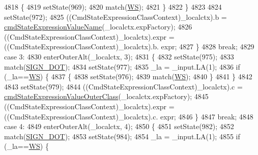 \begin{DoxyCode}
4818           \{
4819           setState(969);
4820           match(\hyperlink{classgov_1_1nasa_1_1jpf_1_1inspector_1_1server_1_1expression_1_1parser_1_1_expression_grammar_parser_ace44714ae633c7b14794cc5a24d9ebf3}{WS});
4821           \}
4822         \}
4823 
4824         setState(972);
4825         ((CmdStateExpressionClassContext)\_localctx).b = 
      \hyperlink{classgov_1_1nasa_1_1jpf_1_1inspector_1_1server_1_1expression_1_1parser_1_1_expression_grammar_parser_ab7b7d7ff1d67db1969528b9cb4557d4e}{cmdStateExpressionValueName}(\_localctx.expFactory);
4826          ((CmdStateExpressionClassContext)\_localctx).expr =  ((CmdStateExpressionClassContext)\_localctx).b.
      expr; 
4827         \}
4828         \textcolor{keywordflow}{break};
4829       \textcolor{keywordflow}{case} 3:
4830         enterOuterAlt(\_localctx, 3);
4831         \{
4832         setState(975);
4833         match(\hyperlink{classgov_1_1nasa_1_1jpf_1_1inspector_1_1server_1_1expression_1_1parser_1_1_expression_grammar_parser_af578d1cac8553bcf6f52608a4e9125f1}{SIGN\_DOT});
4834         setState(977);
4835         \_la = \_input.LA(1);
4836         \textcolor{keywordflow}{if} (\_la==\hyperlink{classgov_1_1nasa_1_1jpf_1_1inspector_1_1server_1_1expression_1_1parser_1_1_expression_grammar_parser_ace44714ae633c7b14794cc5a24d9ebf3}{WS}) \{
4837           \{
4838           setState(976);
4839           match(\hyperlink{classgov_1_1nasa_1_1jpf_1_1inspector_1_1server_1_1expression_1_1parser_1_1_expression_grammar_parser_ace44714ae633c7b14794cc5a24d9ebf3}{WS});
4840           \}
4841         \}
4842 
4843         setState(979);
4844         ((CmdStateExpressionClassContext)\_localctx).c = 
      \hyperlink{classgov_1_1nasa_1_1jpf_1_1inspector_1_1server_1_1expression_1_1parser_1_1_expression_grammar_parser_a3cb4602fb37c47251dc62b7e1d7c9f0c}{cmdStateExpressionValueOuterClass}(\_localctx.expFactory);
4845          ((CmdStateExpressionClassContext)\_localctx).expr =  ((CmdStateExpressionClassContext)\_localctx).c.
      expr; 
4846         \}
4847         \textcolor{keywordflow}{break};
4848       \textcolor{keywordflow}{case} 4:
4849         enterOuterAlt(\_localctx, 4);
4850         \{
4851         setState(982);
4852         match(\hyperlink{classgov_1_1nasa_1_1jpf_1_1inspector_1_1server_1_1expression_1_1parser_1_1_expression_grammar_parser_af578d1cac8553bcf6f52608a4e9125f1}{SIGN\_DOT});
4853         setState(984);
4854         \_la = \_input.LA(1);
4855         \textcolor{keywordflow}{if} (\_la==\hyperlink{classgov_1_1nasa_1_1jpf_1_1inspector_1_1server_1_1expression_1_1parser_1_1_expression_grammar_parser_ace44714ae633c7b14794cc5a24d9ebf3}{WS}) \{

\end{DoxyCode}
